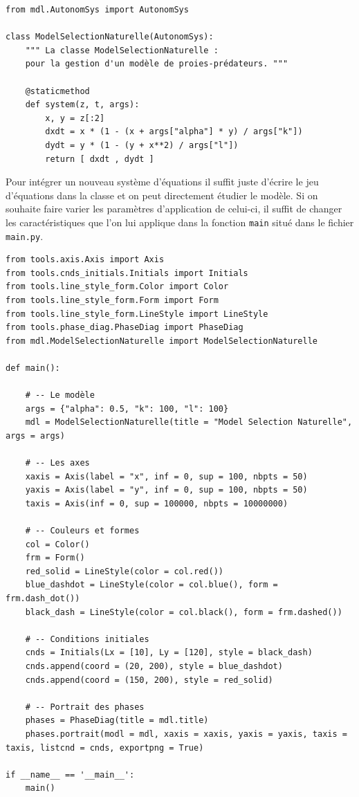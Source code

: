\documentclass{article}
\begin{document}
\begin{verbatim}
from mdl.AutonomSys import AutonomSys

class ModelSelectionNaturelle(AutonomSys):
    """ La classe ModelSelectionNaturelle : 
    pour la gestion d'un modèle de proies-prédateurs. """

    @staticmethod
    def system(z, t, args):
        x, y = z[:2]
        dxdt = x * (1 - (x + args["alpha"] * y) / args["k"])
        dydt = y * (1 - (y + x**2) / args["l"])
        return [ dxdt , dydt ]
\end{verbatim}

\vspace{0.5cm}
Pour intégrer un nouveau système d'équations il suffit juste d'écrire le jeu d'équations dans la classe et on peut directement étudier le modèle.
Si on souhaite faire varier les paramètres d'application de celui-ci, il suffit de changer les caractéristiques que l'on lui applique dans la fonction \verb|main| situé dans le fichier \verb|main.py|.
\vspace{0.5cm}

\begin{verbatim}
from tools.axis.Axis import Axis
from tools.cnds_initials.Initials import Initials
from tools.line_style_form.Color import Color
from tools.line_style_form.Form import Form
from tools.line_style_form.LineStyle import LineStyle
from tools.phase_diag.PhaseDiag import PhaseDiag
from mdl.ModelSelectionNaturelle import ModelSelectionNaturelle

def main():

    # -- Le modèle
    args = {"alpha": 0.5, "k": 100, "l": 100}
    mdl = ModelSelectionNaturelle(title = "Model Selection Naturelle", args = args)

    # -- Les axes
    xaxis = Axis(label = "x", inf = 0, sup = 100, nbpts = 50)
    yaxis = Axis(label = "y", inf = 0, sup = 100, nbpts = 50)
    taxis = Axis(inf = 0, sup = 100000, nbpts = 10000000)

    # -- Couleurs et formes
    col = Color()
    frm = Form()
    red_solid = LineStyle(color = col.red())
    blue_dashdot = LineStyle(color = col.blue(), form = frm.dash_dot())
    black_dash = LineStyle(color = col.black(), form = frm.dashed())
    
    # -- Conditions initiales
    cnds = Initials(Lx = [10], Ly = [120], style = black_dash)
    cnds.append(coord = (20, 200), style = blue_dashdot)
    cnds.append(coord = (150, 200), style = red_solid)

    # -- Portrait des phases
    phases = PhaseDiag(title = mdl.title)
    phases.portrait(modl = mdl, xaxis = xaxis, yaxis = yaxis, taxis = taxis, listcnd = cnds, exportpng = True) 

if __name__ == '__main__':
    main()
\end{verbatim}
\end{document}
